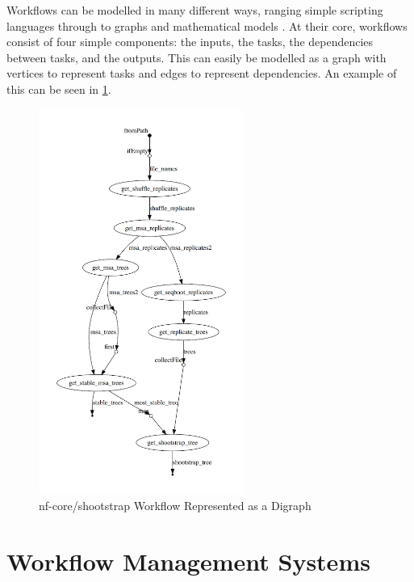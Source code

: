 Workflows can be modelled in many different ways, ranging simple scripting languages through to graphs and mathematical models \cite{Shields}. At their core, workflows consist of four simple components: the inputs, the tasks, the dependencies between tasks, and the outputs. This can easily be modelled as a graph with vertices to represent tasks and edges to represent dependencies. An example of this can be seen in \ref{fig:dag}. 

\begin{figure}[ht]
    \centering
        \includegraphics[width=0.6\textwidth,height=0.9\textheight]{fig/dag.png}
        \caption{nf-core/shootstrap Workflow Represented as a Digraph \cite{dag}}
        \label{fig:dag}
\end{figure}




\section{Workflow Management Systems}
\label{sec:management}



